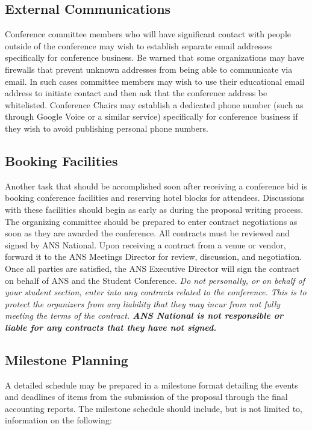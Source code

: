 \documentclass[12pt]{article}
\begin{document}
\subsection{External Communications}
Conference committee members who will have significant contact with people outside of the conference may wish to establish  separate email addresses specifically for conference business.
Be warned that some organizations may have firewalls that prevent unknown addresses from being able to communicate via email.
In such cases committee members may wish to use their educational email address to initiate contact and then ask that the conference address be whitelisted.
Conference Chairs may establish a dedicated phone number (such as through Google Voice or a similar service) specifically for conference business if they wish to avoid publishing personal phone numbers.

\subsection{Booking Facilities}

Another task that should be accomplished soon after receiving a conference bid is booking conference facilities and reserving hotel blocks for attendees.
Discussions with these facilities should begin as early as during the proposal writing process.
The organizing committee should be prepared to enter contract negotiations as soon as they are awarded the conference.
All contracts must be reviewed and signed by ANS National.
Upon receiving a contract from a venue or vendor, forward it to the ANS Meetings Director for review, discussion, and negotiation.
Once all parties are satisfied, the ANS Executive Director will sign the contract on behalf of ANS and the Student Conference.
\emph{Do not personally, or on behalf of your student section, enter into any contracts related to the conference. 
This is to protect the organizers from any liability that they may incur from not fully meeting the terms of the contract.
\textbf{ANS National is not responsible or liable for any contracts that they have not signed.}}

\subsection{Milestone Planning}
A detailed schedule may be prepared in a milestone format detailing the events and deadlines of items from the submission of the proposal through the final accounting reports.
The milestone schedule should include, but is not limited to, information on the following:
\end{document}
